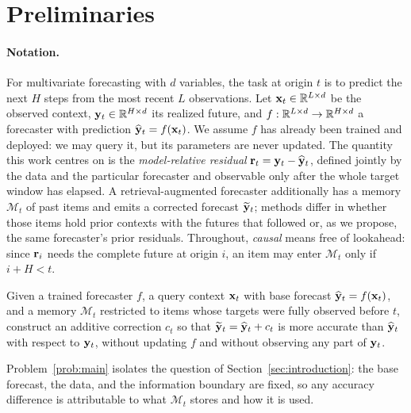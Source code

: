 \section{Preliminaries}
\label{sec:prelim}

\paragraph{Notation.}
For multivariate forecasting with $d$ variables, the task at origin $t$ is to
predict the next $H$ steps from the most recent $L$ observations. Let
$\mathbf{x}_t\in\mathbb{R}^{L\times d}$ be the observed context, $\mathbf{y}_t\in\mathbb{R}^{H\times d}$
its realized future, and $f:\mathbb{R}^{L\times d}\to\mathbb{R}^{H\times d}$ a forecaster with
prediction $\widehat{\mathbf{y}}_t=f(\mathbf{x}_t)$. We assume $f$ has already been trained and
deployed: we may query it, but its parameters are never updated. The quantity this work centres on is the \emph{model-relative residual}
$\mathbf{r}_t = \mathbf{y}_t - \widehat{\mathbf{y}}_t$, defined jointly by the data and the particular
forecaster and observable only after the whole target window has elapsed. A
retrieval-augmented forecaster additionally has a memory $\mathcal{M}_t$ of past
items and emits a corrected forecast $\widetilde{\mathbf{y}}_t$; methods differ in whether those
items hold prior contexts with the futures that followed or, as we propose, the
same forecaster's prior residuals. Throughout, \emph{causal} means
free of lookahead: since $\mathbf{r}_i$ needs the complete future at origin $i$, an
item may enter $\mathcal{M}_t$ only if $i+H<t$.

\begin{problem}
\label{prob:main}
Given a trained forecaster $f$, a query context $\mathbf{x}_t$ with base forecast
$\widehat{\mathbf{y}}_t=f(\mathbf{x}_t)$, and a memory $\mathcal{M}_t$ restricted to items whose
targets were fully observed before $t$, construct an additive correction $c_t$
so that $\widetilde{\mathbf{y}}_t=\widehat{\mathbf{y}}_t+c_t$ is more accurate than $\widehat{\mathbf{y}}_t$ with respect to
$\mathbf{y}_t$, without updating $f$ and without observing any part of $\mathbf{y}_t$.
\end{problem}

Problem~\ref{prob:main} isolates the question of
Section~\ref{sec:introduction}: the base forecast, the data, and the information
boundary are fixed, so any accuracy difference is attributable to what
$\mathcal{M}_t$ stores and how it is used.
